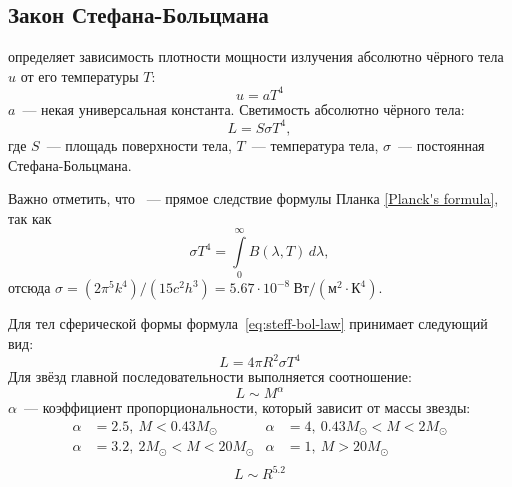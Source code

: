 \subsection{Закон Стефана-Больцмана}
 определяет зависимость плотности мощности излучения абсолютно чёрного тела $u$ от его температуры $T$:
\begin{equation}
u = a T^4
\end{equation} 
$a$~--- некая универсальная константа.
Светимость абсолютно чёрного тела:
	\begin{equation}
	L = S \sigma T^4,
	\label{eq:steff-bol-law}
\end{equation}
 где $S$~--- площадь поверхности тела, $T$~--- температура тела, $\sigma$~--- постоянная Стефана-Больцмана.
  
Важно отметить, что ~--- прямое следствие формулы Планка \eqref{Planck's formula}, так как\begin{equation}
	\sigma T^4 = \int\limits^\infty_0 B(\lambda, T)\,d\lambda,
\end{equation}
отсюда $\sigma = (2\pi^5k^4)/(15c^2h^3) = 5.67 \cdot 10^{-8}~\text{Вт}/(\text{м}^2\cdot \text{К}^4)$.


Для тел сферической формы формула~\eqref{eq:steff-bol-law} принимает следующий вид:
\begin{equation}
L=4\pi R^2\sigma T^4
\end{equation}
Для звёзд главной последовательности выполняется соотношение:
\begin{equation}
L\sim M^{\alpha}
\end{equation}
$\alpha$~--- коэффициент пропорциональности, который зависит от массы звезды:
\begin{align*}
\alpha &= 2.5, ~ M < 0.43 M_\odot & \alpha &= 4, ~ 0.43 M_\odot < M < 2 M_\odot\\ \alpha &= 3.2, ~ 2 M_\odot < M < 20 M_\odot & \alpha &= 1, ~ M > 20 M_\odot\\
\end{align*}
\begin{equation}
L\sim R^{5.2}
\end{equation}
